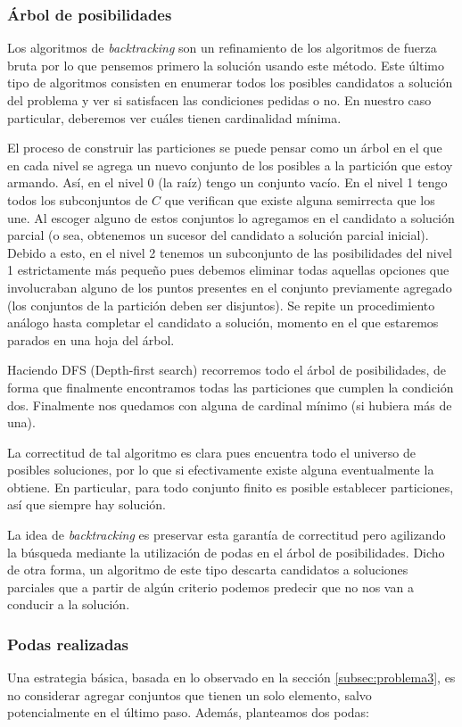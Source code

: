 \subsubsection{Árbol de posibilidades}
Los algoritmos de \textit{backtracking} son un refinamiento de los algoritmos de fuerza bruta por lo que pensemos primero la solución usando este método. Este último tipo de algoritmos consisten en enumerar todos los posibles candidatos a solución del problema y ver si satisfacen las condiciones pedidas o no. En nuestro caso particular, deberemos ver cuáles tienen cardinalidad mínima.

El proceso de construir las particiones se puede pensar como un árbol en el que en cada nivel se agrega un nuevo conjunto de los posibles a la partición que estoy armando. Así, en el nivel 0 (la raíz) tengo un conjunto vacío. En el nivel 1 tengo todos los subconjuntos de $C$ que verifican que existe alguna semirrecta que los une. Al escoger alguno de estos conjuntos lo agregamos en el candidato a solución parcial (o sea, obtenemos un sucesor del candidato a solución parcial inicial). Debido a esto, en el nivel 2 tenemos un subconjunto de las posibilidades del nivel 1 estrictamente más pequeño pues debemos eliminar todas aquellas opciones que involucraban alguno de los puntos presentes en el conjunto previamente agregado (los conjuntos de la partición deben ser disjuntos). Se repite un procedimiento análogo hasta completar el candidato a solución, momento en el que estaremos parados en una hoja del árbol. 

Haciendo DFS (Depth-first search) recorremos todo el árbol de posibilidades, de forma que finalmente encontramos todas las particiones que cumplen la condición dos. Finalmente nos quedamos con alguna de cardinal mínimo (si hubiera más de una).

La correctitud de tal algoritmo es clara pues encuentra todo el universo de posibles soluciones, por lo que si efectivamente existe alguna eventualmente la obtiene. En particular, para todo conjunto finito es posible establecer particiones, así que siempre hay solución. 

La idea de \textit{backtracking} es preservar esta garantía de correctitud pero agilizando la búsqueda mediante la utilización de podas en el árbol de posibilidades. Dicho de otra forma, un algoritmo de este tipo descarta candidatos a soluciones parciales que a partir de algún criterio podemos predecir que no nos van a conducir a la solución. 

\subsubsection{Podas realizadas}
Una estrategia básica, basada en lo observado en la sección \ref{subsec:problema3}, es no considerar agregar conjuntos que tienen un solo elemento, salvo potencialmente en el último paso. Además, planteamos dos podas:

